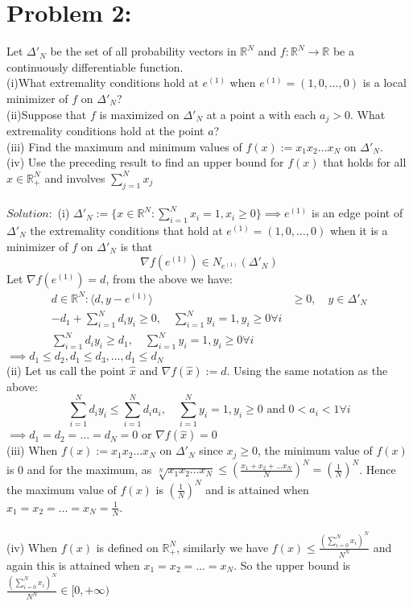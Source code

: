 \documentclass[12pt]{report}
\begin{document}
\section*{Problem 2:}
Let $\Delta'_N$ be the set of all probability vectors in $\mathbb{R}^N$ and
$f:\mathbb{R}^N\rightarrow\mathbb{R}$ be a continuously differentiable function.\\
(i)What extremality conditions hold at $e^{(1)}$ when $e^{(1)}=(1,0,\dots,0)$ is a
local minimizer of $f$ on $\Delta'_N$?\\
(ii)Suppose that $f$ is maximized on $\Delta'_N$ at a point a with each $a_j>0$.
What extremality conditions hold at the point $a$?\\
(iii) Find the maximum and minimum values of $f(x):=x_1x_2\dots x_N$ on $\Delta'_N$.\\
(iv) Use the preceding result to find an upper bound for $f(x)$ that holds for all
$x \in \mathbb{R}^N_+$ and involves $\sum_{j=1}^N x_j$\\
\\
$Solution:$ (i) $\Delta'_N:=\{ x \in \mathbb{R}^N: \sum_{i=1}^N x_i=1, x_i\geq 0 \}
\implies e^{(1)}$ is an edge point of $\Delta'_N$ the extremality conditions that hold
at $e^{(1)}=(1,0,\dots,0)$ when it is a minimizer of $f$ on $\Delta'_N$ is that
$$\nabla f(e^{(1)}) \in N_{e^{(1)}}(\Delta'_N)$$ 
Let $\nabla f(e^{(1)})=d$, from the above we have:
\begin{align*}
d \in \mathbb{R}^N: \langle d, y-e^{(1)} \rangle &\geq 0, \quad y \in \Delta'_N \\
-d_1 + \sum_{i=1}^N d_i y_i \geq 0, \quad \sum_{i=1}^N y_i =1, y_i \geq 0 \forall i \\
\sum_{i=1}^N d_i y_i \geq d_1, \quad \sum_{i=1}^N y_i =1, y_i \geq 0 \forall i 
\end{align*}
$\implies d_1\leq d_2, d_1\leq d_3, \dots ,d_1\leq d_N$
\\
(ii) Let us call the point $\hat{x}$ and $\nabla f(\hat{x}):=d$. Using the same
notation as the above:
$$\sum_{i=1}^Nd_iy_i\leq\sum_{i=1}^N d_i a_i ,\quad\sum_{i=1}^N y_i =1,y_i\geq 0
\text{ and } 0<a_i<1 \forall i $$
$\implies d_1 = d_2 = \dots = d_N = 0$ or $\nabla f(\hat{x})=0$
\\
(iii) When $f(x):=x_1x_2 \dots x_N$ on $\Delta'_N$ since $x_j\geq 0$, the minimum
value of $f(x)$ is 0 and for the maximum, as
$\sqrt[N]{x_1x_2\dots x_N}\leq(\frac{x_1+x_2+\dots x_N}{N})^N=(\frac{1}{N})^N$. Hence
the maximum value of $f(x)$ is $(\frac{1}{N})^N$ and is attained when
$x_1=x_2=\dots =x_N=\frac{1}{N}$.\\
\\
(iv) When $f(x)$ is defined on $\mathbb{R}^N_+$, similarly we have
$f(x)\leq \frac{(\sum_{i=0}^N x_i)^N}{N^N}$ and again this is attained when
$x_1=x_2=\dots =x_N$. So the upper bound is
$\frac{(\sum_{i=0}^N x_i)^N}{N^N} \in [0,+\infty)$
\end{document}

